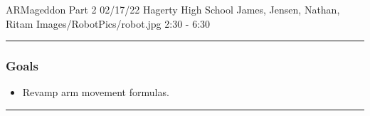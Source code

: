 \insertmeeting 
	{ARMageddon Part 2} 
	{02/17/22} 
	{Hagerty High School}
	{James, Jensen, Nathan, Ritam}
	{Images/RobotPics/robot.jpg}
	{2:30 - 6:30}
	
\noindent\hfil\rule{\textwidth}{.4pt}\hfil
\subsubsection*{Goals}
\begin{itemize}
    \item Revamp arm movement formulas.

\end{itemize} 

\noindent\hfil\rule{\textwidth}{.4pt}\hfil

